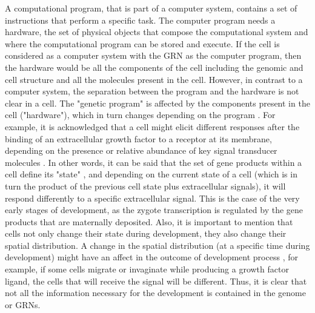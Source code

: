 A computational program, that is part of a computer system, contains a set of instructions that perform a specific task. The computer program needs a hardware, the set of physical objects that compose the computational system and where the computational program can be stored and execute.
If the cell is considered as a computer system with the GRN as the computer program, then the hardware would be all the components of the cell including the genomic and cell structure and all the molecules present in the cell.
However, in contrast to a computer system, the separation between the program and the hardware is not clear in a cell. The "genetic program" is affected by the components present in the cell ("hardware"), which in turn changes depending on the program \citep{susan2000ontogeny,Jaeger2014devmech}.  For example, it is acknowledged that a cell might elicit different responses after the binding of an extracellular growth factor to a receptor at its membrane, depending on the presence or relative abundance of key signal transducer molecules \citep{Dailey2005}. In other words, it can be said that the set of gene products within a cell define its "state" \citep{Forgacs_Newman2005}, and depending on the current state of a cell (which is in turn the product of the previous cell state plus extracellular signals), it will respond differently to a specific extracellular signal. This is the case of the very early stages of development, as the zygote transcription is regulated by the gene products that are maternally deposited. Also, it is important to mention that cells not only change their state during development, they also change their spatial distribution. A change in the spatial distribution (at a specific time during development) might have an affect in the outcome of development process \citep{Salazar-Ciudad2010}, for example, if some cells migrate or invaginate while producing a growth factor ligand, the cells that will receive the signal will be different. Thus, it is clear that not all the information necessary for the development is contained in the genome or GRNs.
